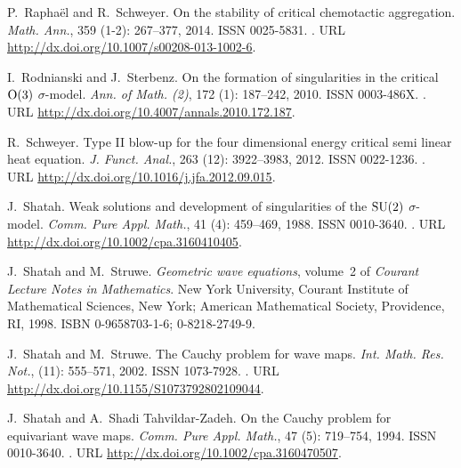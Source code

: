 \documentclass[11pt]{aims}
\theoremstyle{definition}
\numberwithin{equation}{section}
\begin{document}
\begin{thebibliography}{62}
P.~Rapha{\"e}l and R.~Schweyer.
\newblock On the stability of critical chemotactic aggregation.
\newblock \emph{Math. Ann.}, 359 (1-2): 267--377,
  2014{}.
\newblock ISSN 0025-5831.
\newblock {}.
\newblock URL \url{http://dx.doi.org/10.1007/s00208-013-1002-6}.

I.~Rodnianski and J.~Sterbenz.
\newblock On the formation of singularities in the critical {${\rm O}(3)$}
  {$\sigma$}-model.
\newblock \emph{Ann. of Math. (2)}, 172 (1): 187--242, 2010.
\newblock ISSN 0003-486X.
\newblock {}.
\newblock URL \url{http://dx.doi.org/10.4007/annals.2010.172.187}.

R.~Schweyer.
\newblock Type {II} blow-up for the four dimensional energy critical semi
  linear heat equation.
\newblock \emph{J. Funct. Anal.}, 263 (12): 3922--3983, 2012.
\newblock ISSN 0022-1236.
\newblock {}.
\newblock URL \url{http://dx.doi.org/10.1016/j.jfa.2012.09.015}.

J.~Shatah.
\newblock Weak solutions and development of singularities of the {${\rm
  SU}(2)$} {$\sigma$}-model.
\newblock \emph{Comm. Pure Appl. Math.}, 41 (4): 459--469,
  1988.
\newblock ISSN 0010-3640.
\newblock {}.
\newblock URL \url{http://dx.doi.org/10.1002/cpa.3160410405}.

J.~Shatah and M.~Struwe.
\newblock \emph{Geometric wave equations}, volume~2 of \emph{Courant Lecture
  Notes in Mathematics}.
\newblock New York University, Courant Institute of Mathematical Sciences, New
  York; American Mathematical Society, Providence, RI, 1998.
\newblock ISBN 0-9658703-1-6; 0-8218-2749-9.

J.~Shatah and M.~Struwe.
\newblock The {C}auchy problem for wave maps.
\newblock \emph{Int. Math. Res. Not.},  (11): 555--571, 2002.
\newblock ISSN 1073-7928.
\newblock {}.
\newblock URL \url{http://dx.doi.org/10.1155/S1073792802109044}.

J.~Shatah and A.~Shadi Tahvildar-Zadeh.
\newblock On the {C}auchy problem for equivariant wave maps.
\newblock \emph{Comm. Pure Appl. Math.}, 47 (5): 719--754,
  1994.
\newblock ISSN 0010-3640.
\newblock {}.
\newblock URL \url{http://dx.doi.org/10.1002/cpa.3160470507}.


\end{thebibliography}
\end{document}
